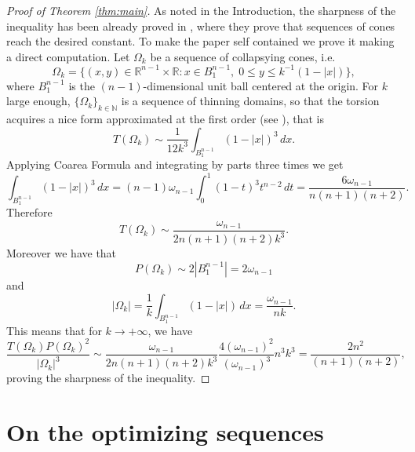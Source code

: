 \documentclass[oneside,a4paper,11pt,notitlepage]{article}
\newcommand{\abs}[1]{{\left|#1\right|}}
\theoremstyle{definition}
\theoremstyle{plain}
\theoremstyle{definition}
\begin{document}
\begin{proof}[Proof of Theorem \ref{thm:main}]
As noted in the Introduction, the sharpness of the inequality has been already proved in \cite{buttazzo2020convex}, where they prove that sequences of cones reach the desired constant. To make the paper self contained we prove it making a direct computation. 
Let $\Omega_k$ be a sequence of collapsying cones, i.e.
    \begin{equation*}
        \Omega_k = \{(x,y)\in \mathbb R^{n-1}\times\mathbb R: x\in B_1^{n-1}, \; 0\le y \le k^{-1}(1-\abs{x})\},
    \end{equation*}
    where $B_1^{n-1}$ is the $(n-1)$-dimensional  unit ball centered at the origin. For $k$ large enough, $\{\Omega_k\}_{k\in \mathbb N}$ is a sequence of thinning domains, so that the torsion acquires a nice form approximated at the first order (see \cite{BFreitas, buttazzo2020convex}), that is
    \begin{equation*}
        T(\Omega_k) \sim \frac{1}{12k^3}\int_{B_1^{n-1}}(1-\abs{x})^3\,dx.
    \end{equation*}
    Applying Coarea Formula and integrating by parts  three times we get
    \begin{equation*}
     \int_{B_1^{n-1}}(1-\abs{x})^3\,dx= (n-1)\omega_{n-1}\int_0^1(1-t)^3t^{n-2}\,dt = \frac{6\omega_{n-1}}{n(n+1)(n+2)}.  
    \end{equation*}
    Therefore
    \begin{equation*}
        T(\Omega_k) \sim \frac{\omega_{n-1}}{2n(n+1)(n+2)k^3}.
    \end{equation*}
    Moreover we have that
    \begin{equation*}
        P(\Omega_k) \sim 2|B_1^{n-1}| = 2\omega_{n-1}
    \end{equation*}
    and
    \begin{equation*}
        |\Omega_k|= \frac{1}{k}\int_{B_1^{n-1}}(1-\abs{x})\,dx = \frac{\omega_{n-1}}{nk}.
    \end{equation*}
    This means that for $k\to +\infty$, we have
    \begin{equation*}
        \frac{T(\Omega_k)P(\Omega_k)^2}{\abs{\Omega_k}^3}\sim \frac{\omega_{n-1}}{2n(n+1)(n+2)k^3}\frac{4(\omega_{n-1})^2}{(\omega_{n-1})^3}n^3k^3 = \frac{2n^2}{(n+1)(n+2)},
    \end{equation*}
    proving the sharpness of the inequality. 
\end{proof}
    
    \section{On the optimizing sequences}
\end{document}
